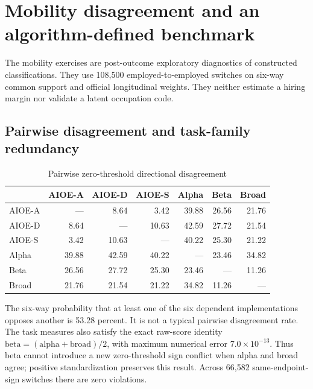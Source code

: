 \section{Mobility disagreement and an algorithm-defined benchmark}\label{app:reallocation}

The mobility exercises are post-outcome exploratory diagnostics of constructed
classifications.  They use 108,500 employed-to-employed switches on six-way
common support and official longitudinal weights.  They neither estimate a
hiring margin nor validate a latent occupation code.

\subsection{Pairwise disagreement and task-family redundancy}

\begin{table}[htbp]
\centering
\caption{Pairwise zero-threshold directional disagreement}\label{tab:apppairwise}
\scriptsize
\setlength{\tabcolsep}{4pt}
\begin{tabular}{lrrrrrr}
\toprule
 & AIOE-A & AIOE-D & AIOE-S & Alpha & Beta & Broad \\
\midrule
AIOE-A & --- & 8.64 & 3.42 & 39.88 & 26.56 & 21.76 \\
AIOE-D & 8.64 & --- & 10.63 & 42.59 & 27.72 & 21.54 \\
AIOE-S & 3.42 & 10.63 & --- & 40.22 & 25.30 & 21.22 \\
Alpha  & 39.88 & 42.59 & 40.22 & --- & 23.46 & 34.82 \\
Beta   & 26.56 & 27.72 & 25.30 & 23.46 & --- & 11.26 \\
Broad  & 21.76 & 21.54 & 21.22 & 34.82 & 11.26 & --- \\
\bottomrule
\end{tabular}
\end{table}

The six-way probability that at least one of the six dependent implementations
opposes another is 53.28 percent.  It is not a typical pairwise disagreement
rate.  The task measures also satisfy the exact raw-score identity
$\mathrm{beta}=(\mathrm{alpha}+\mathrm{broad})/2$, with maximum numerical error
$7.0\times10^{-13}$.  Thus beta cannot introduce a new zero-threshold sign
conflict when alpha and broad agree; positive standardization preserves this
result.  Across 66,582 same-endpoint-sign switches there are zero violations.

